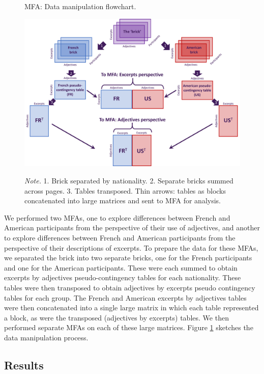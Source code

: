 \documentclass[
  english,
  man,floatsintext]{apa6}
\begin{document}
\begin{figure}   
  \centering  
  \caption{MFA: Data manipulation flowchart.}
    \includegraphics[width=1\columnwidth]{./Music-Descriptor-Space_files/figure-latex/mfadataflow.png}
  \label{fig:mfadataflow}
  \caption*{\footnotesize \textit{Note.} 1. Brick separated by nationality. 2. Separate bricks summed across pages. 3. Tables transposed. Thin arrows: tables as blocks concatenated into large matrices and sent to MFA for analysis.}
\end{figure}

We performed two MFAs, one to explore differences between French and American participants from the perspective of their use of adjectives, and another to explore differences between French and American participants from the perspective of their descriptions of excerpts. To prepare the data for these MFAs, we separated the brick into two separate bricks, one for the French participants and one for the American participants. These were each summed to obtain excerpts by adjectives pseudo-contingency tables for each nationality. These tables were then transposed to obtain adjectives by excerpts pseudo contingency tables for each group. The French and American excerpts by adjectives tables were then concatenated into a single large matrix in which each table represented a block, as were the transposed (adjectives by excerpts) tables. We then performed separate MFAs on each of these large matrices. Figure \ref{fig:mfadataflow} sketches the data manipulation process.

\hypertarget{results-1}{%
\subsection{Results}\label{results-1}}
\end{document}
